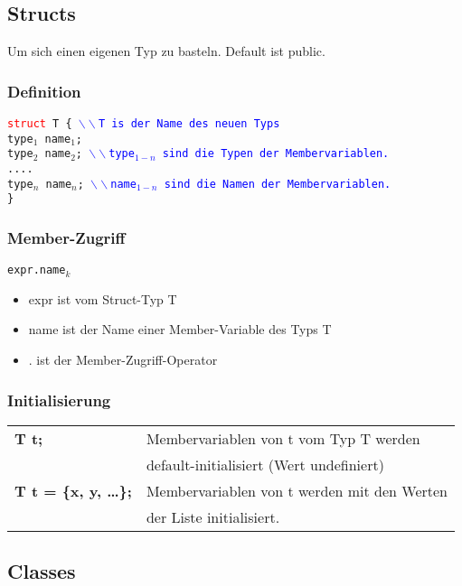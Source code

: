 \documentclass[a3paper, 10pt, landscape]{scrartcl}
\newcommand{\code}[1]{\texttt{#1}}
\begin{document}
\begin{multicols*}{3}
	\subsection{Structs}
	\vspace{0.1cm}
	Um sich einen eigenen Typ zu basteln. Default ist public.
	\subsubsection{Definition}
	\vspace{0.1cm}
	\code{\textcolor{red}{struct} T \{ \textcolor{blue}{$\backslash \backslash$T is der Name des neuen Typs} \\
	\phantom{struct } type$_1$ name$_1$; \\
	\phantom{struct } type$_2$ name$_2$; \textcolor{blue}{$\backslash \backslash$type$_{1-n}$ sind die Typen der Membervariablen.}\\
	\phantom{struct } .... \\
	\phantom{struct } type$_n$ name$_n$; \textcolor{blue}{$\backslash \backslash$name$_{1-n}$ sind die Namen der Membervariablen.}  \\
	\}
	}
	\subsubsection{Member-Zugriff}
	
	\code{expr.name$_k$}
	\begin{itemize}
		\item expr ist vom Struct-Typ T
		\item name ist der Name einer Member-Variable des Typs T
		\item . ist der Member-Zugriff-Operator
	\end{itemize}
	
	\subsubsection{Initialisierung}
	\begin{tabular}{l l}
		\textbf{T t;} & Membervariablen von t vom Typ T werden  \\
		& default-initialisiert (Wert undefiniert) \\
		\textbf{T t = \{x, y, \dots\};} & Membervariablen von t werden mit den Werten \\
		& der Liste initialisiert. \\
	\end{tabular}
	
	\subsection{Classes}
	

\end{multicols*}
\end{document}
